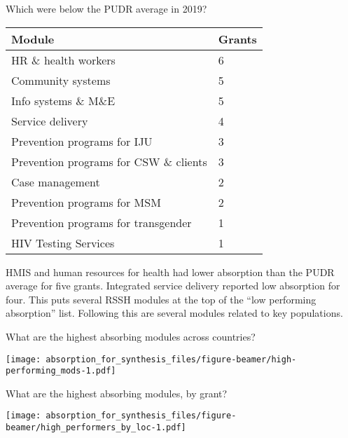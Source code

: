 \documentclass[ignorenonframetext,]{beamer}
\begin{document}
\begin{frame}{Which were below the PUDR average in 2019?}
\protect\hypertarget{which-were-below-the-pudr-average-in-2019}{}

\begin{table}[H]
\centering\begingroup\fontsize{9}{11}\selectfont

\begin{tabular}{l|l}
\hline
Module & Grants\\
\hline
HR \& health workers & 6\\
\hline
Community systems & 5\\
\hline
Info systems \& M\&E & 5\\
\hline
Service delivery & 4\\
\hline
Prevention programs for IJU & 3\\
\hline
Prevention programs for CSW \& clients & 3\\
\hline
Case management & 2\\
\hline
Prevention programs for MSM & 2\\
\hline
Prevention programs for transgender & 1\\
\hline
HIV Testing Services & 1\\
\hline
\end{tabular}\endgroup{}
\end{table}

HMIS and human resources for health had lower absorption than the PUDR
average for five grants. Integrated service delivery reported low
absorption for four. This puts several RSSH modules at the top of the
``low performing absorption'' list. Following this are several modules
related to key populations.

\end{frame}

\begin{frame}{What are the highest absorbing modules across countries?}
\protect\hypertarget{what-are-the-highest-absorbing-modules-across-countries}{}

\texttt{[image: absorption\_for\_synthesis\_files/figure-beamer/high-performing\_mods-1.pdf]}

\end{frame}

\begin{frame}{What are the highest absorbing modules, by grant?}
\protect\hypertarget{what-are-the-highest-absorbing-modules-by-grant}{}

\texttt{[image: absorption\_for\_synthesis\_files/figure-beamer/high\_performers\_by\_loc-1.pdf]}

\end{frame}
\end{document}
